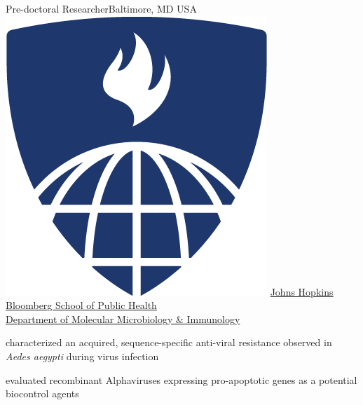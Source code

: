 \documentclass[letterpaper]{twentysecond-charactersheet}
\begin{document}
%
	{Pre-doctoral Researcher}{Baltimore, MD USA}%
	{\includegraphics[width=\logowidth]{img/JHSPH.png}}%
	{\href{http://www.jhsph.edu/departments/w-harry-feinstone-department-of-molecular-microbiology-and-immunology/}{Johns Hopkins Bloomberg School of Public Health\\Department of Molecular Microbiology \& Immunology}}%
	{\begin{itemize}
			{\item[\color{gold}\faStar] characterized an acquired, sequence-specific anti-viral resistance observed in \emph{Aedes aegypti} during virus infection}
		\end{itemize}
		\begin{itemize}
			{\item evaluated recombinant Alphaviruses expressing pro-apoptotic genes as a potential biocontrol agents}
		\end{itemize}
	}
\end{document}
